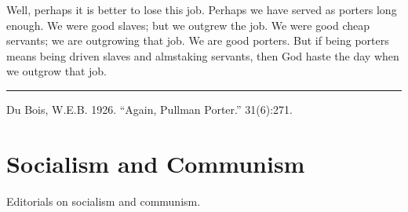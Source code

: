 \documentclass[letterpaper,10pt,english]{jupyterBook}
\begin{document}
\sphinxAtStartPar
Well, perhaps it is better to lose this job. Perhaps we have served as porters long enough. We were good slaves; but we outgrew the job. We were good cheap servants; we are outgrowing that job. We are good porters. But if being porters means being driven slaves and alms\sphinxhyphen{}taking servants, then God haste the day when we outgrow that job.


\bigskip\hrule\bigskip


\sphinxAtStartPar
{} Du Bois, W.E.B. 1926. “Again, Pullman Porter.”  31(6):271.


\section{Socialism and Communism}
\label{\detokenize{Sections/socialism:socialism-and-communism}}\label{\detokenize{Sections/socialism::doc}}
\sphinxAtStartPar
Editorials on socialism and communism.
\end{document}
